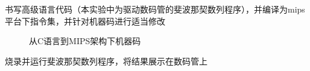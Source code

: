 \documentclass[UTF8]{article}
\begin{document}
书写高级语言代码（本实验中为驱动数码管的斐波那契数列程序），并编译为mips平台下指令集，并针对机器码进行适当修改
\begin{figure}[H]
    \centering
    \caption{从C语言到MIPS架构下机器码}
    \label{FIG6}
\end{figure}
烧录并运行斐波那契数列程序，将结果展示在数码管上
\end{document}
